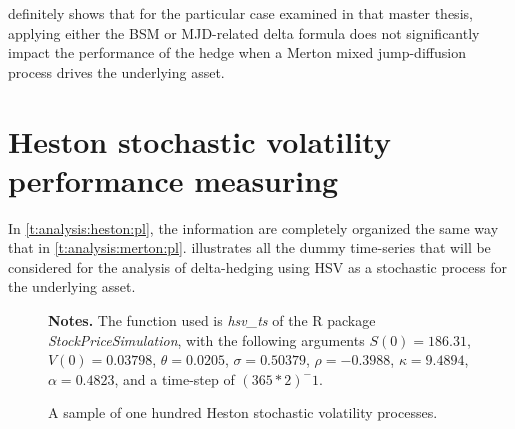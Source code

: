 \documentclass[12pt,a4paper]{report}
\begin{document}
 definitely shows that for the particular case examined in that master thesis, applying either the BSM or MJD-related delta formula does not significantly impact the performance of the hedge when a Merton mixed jump-diffusion process drives the underlying asset.



















































\section{Heston stochastic volatility performance measuring}
\label{sec:section name}


In \cref{t:analysis:heston:pl}, the information are completely organized the same way that in \cref{t:analysis:merton:pl}. 
 illustrates all the dummy time-series that will be considered for the analysis of delta-hedging using HSV as a stochastic process for the underlying asset.


\begin{figure}[ht]
  \centering
  
  \caption{A sample of one hundred Heston stochastic volatility processes.}
  \begin{changemargin}{0.5cm}{0.5cm}
  \medskip
\footnotesize
{}\textbf{Notes.} The function used is \textit{hsv\_ts} of the R package \textit{StockPriceSimulation}, with the following arguments $S(0) = 186.31$,  $V(0) = 0.03798$, $\theta = 0.0205$, $\sigma = 0.50379$, $\rho = -0.3988$,  $\kappa = 9.4894$, $\alpha  = 0.4823$, and a time-step of $(365 * 2)^-1$.
  \end{changemargin}
  \label{p:analysis:hsv:100}
\end{figure}
\end{document}
